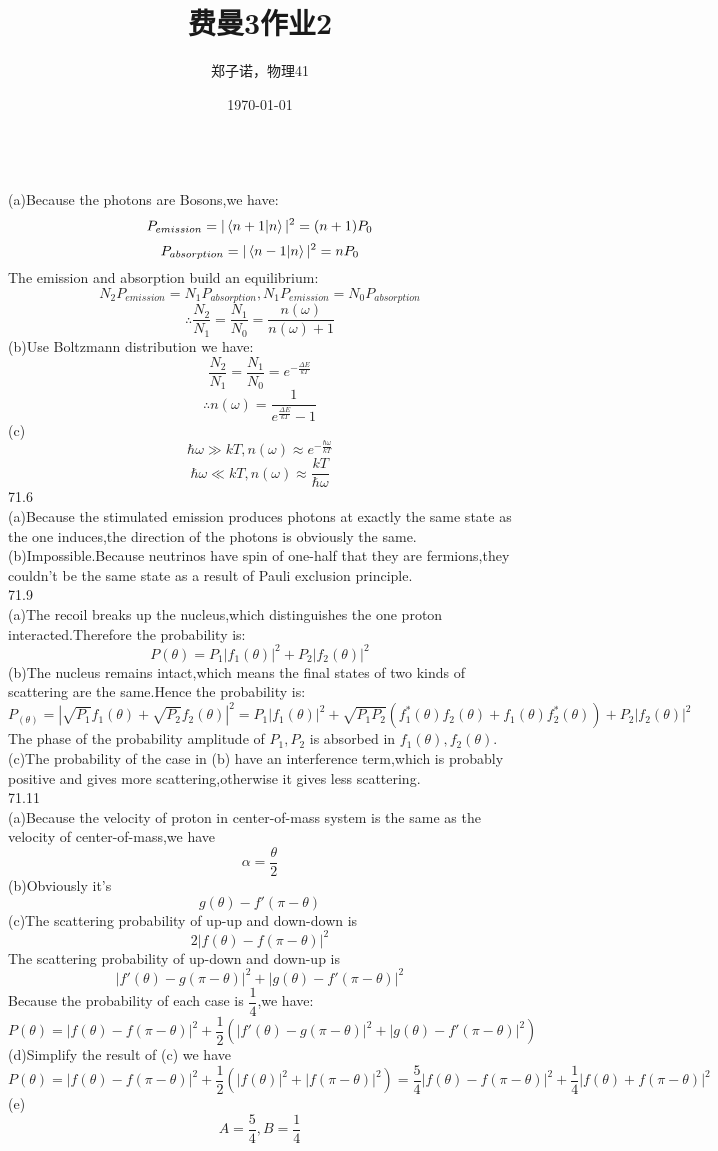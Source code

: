 \documentclass[utf8]{ctexart}
\title{费曼3作业2}
\author{郑子诺，物理41}
\date{\today}
\begin{document}
\\
(a)Because the photons are Bosons,we have:
\[P_{emission}=|\braket{n+1|n}|^2=(n+1)P_0\]
\[P_{absorption}=|\braket{n-1|n}|^2=nP_0\]
The emission and absorption build an equilibrium:
\[N_2P_{emission}=N_1P_{absorption},N_1P_{emission}=N_0P_{absorption}\]
\[\therefore\frac{N_2}{N_1}=\frac{N_1}{N_0}=\frac{n(\omega)}{n(\omega)+1}\] 
(b)Use Boltzmann distribution we have:
\[\frac{N_2}{N_1}=\frac{N_1}{N_0}=e^{-\frac{\Delta E}{kT}}\]
\[\therefore n(\omega)=\frac{1}{e^{\frac{\Delta E}{kT}}-1}\]
(c)\\
\[\hbar\omega\gg kT,n(\omega)\approx e^{-\frac{\hbar\omega}{kT}}\]
\[\hbar\omega\ll kT,n(\omega)\approx \frac{kT}{\hbar\omega}\]
71.6\\
(a)Because the stimulated emission produces photons at exactly the same state as the one induces,the direction of the photons is obviously the same.\\
(b)Impossible.Because neutrinos have spin of one-half that they are fermions,they couldn't be the same state as a result of Pauli exclusion principle.\\
71.9\\
(a)The recoil breaks up the nucleus,which distinguishes the one proton interacted.Therefore the probability is:
\[P(\theta)=P_1|f_1(\theta)|^2+P_2|f_2(\theta)|^2\]
(b)The nucleus remains intact,which means the final states of two kinds of scattering are the same.Hence the probability is:
\[P_(\theta)=|\sqrt{P_1}f_1(\theta)+\sqrt{P_2}f_2(\theta)|^2=P_1|f_1(\theta)|^2+\sqrt{P_1P_2}(f_1^*(\theta)f_2(\theta)+f_1(\theta)f_2^*(\theta))+P_2|f_2(\theta)|^2\]
The phase of the probability amplitude of $P_1,P_2$ is absorbed in $f_1(\theta),f_2(\theta)$.
(c)The probability of the case in (b) have an interference term,which is probably positive and gives more scattering,otherwise it gives less scattering.\\
71.11\\
(a)Because the velocity of proton in center-of-mass system is the same as the velocity of center-of-mass,we have
\[\alpha=\frac{\theta}{2}\]
(b)Obviously it's
\[g(\theta)-f'(\pi-\theta)\]
(c)The scattering probability of up-up and down-down is
\[2|f(\theta)-f(\pi-\theta)|^2\]
The scattering probability of up-down and down-up is
\[|f'(\theta)-g(\pi-\theta)|^2+|g(\theta)-f'(\pi-\theta)|^2\]
Because the probability of each case is $\dfrac{1}{4}$,we have:
\[P(\theta)=|f(\theta)-f(\pi-\theta)|^2+\frac{1}{2}(|f'(\theta)-g(\pi-\theta)|^2+|g(\theta)-f'(\pi-\theta)|^2)\]
(d)Simplify the result of (c) we have
\[P(\theta)=|f(\theta)-f(\pi-\theta)|^2+\frac{1}{2}(|f(\theta)|^2+|f(\pi-\theta)|^2)=\frac{5}{4}|f(\theta)-f(\pi-\theta)|^2+\frac{1}{4}|f(\theta)+f(\pi-\theta)|^2\]
(e)\[A=\frac{5}{4},B=\frac{1}{4}\]
\end{document}
